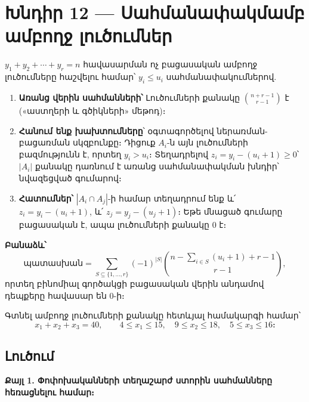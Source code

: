 \documentclass[12pt, a4paper]{article}
\begin{document}
\section{Խնդիր 12 — Սահմանափակմամբ ամբողջ լուծումներ}

\begin{theorybox}
$y_1 + y_2 + \cdots + y_r = n$ հավասարման ոչ բացասական ամբողջ լուծումները հաշվելու համար՝ $y_i \le u_i$ սահմանափակումներով.

\begin{enumerate}[nosep]
  \item \textbf{Առանց վերին սահմանների՝}\;
        Լուծումների քանակը $\binom{n+r-1}{r-1}$ է («աստղերի և գծիկների» մեթոդ)։
  \item \textbf{Հանում ենք խախտումները}՝ օգտագործելով ներառման-բացառման սկզբունքը։
        Դիցուք $A_i$-ն այն լուծումների բազմությունն է, որտեղ $y_i > u_i$։
        Տեղադրելով $z_i = y_i - (u_i + 1) \ge 0$՝ $|A_i|$ քանակը
        դառնում է առանց սահմանափակման խնդիր՝ նվազեցված գումարով։
  \item \textbf{Հատումներ՝}\;
        $|A_i \cap A_j|$-ի համար տեղադրում ենք և՛ $z_i = y_i - (u_i+1)$,
        և՛ $z_j = y_j - (u_j+1)$։
        Եթե մնացած գումարը բացասական է, ապա լուծումների քանակը $0$ է։
\end{enumerate}

\medskip
\textbf{Բանաձև՝}
\[
  \text{պատասխան} = \sum_{S \subseteq \{1,\ldots,r\}} (-1)^{|S|}
  \binom{n - \sum_{i \in S}(u_i+1) + r - 1}{r-1},
\]
որտեղ բինոմիալ գործակցի բացասական վերին անդամով դեպքերը հավասար են $0$-ի։
\end{theorybox}

\begin{problembox}
Գտնել ամբողջ լուծումների քանակը հետևյալ համակարգի համար՝
\[
  x_1 + x_2 + x_3 = 40, \qquad
  4 \le x_1 \le 15, \quad
  9 \le x_2 \le 18, \quad
  5 \le x_3 \le 16։
\]
\end{problembox}

\subsection*{Լուծում}

\textbf{Քայլ 1. Փոփոխականների տեղաշարժ ստորին սահմանները հեռացնելու համար։}
\end{document}

